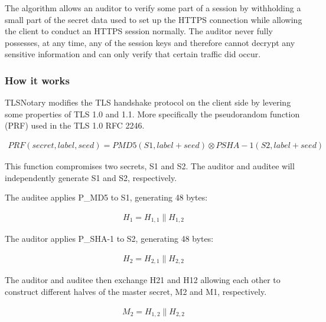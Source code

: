 The algorithm allows an auditor to verify some part of a session by withholding a small part of the secret data used to set up the HTTPS connection while allowing the client to conduct an HTTPS session normally. The auditor never fully possesses, at any time, any of the session keys and therefore cannot decrypt any sensitive information and can only verify that certain traffic did occur.

\subsubsection{How it works}
TLSNotary modifies the TLS handshake protocol on the client side by levering some properties of TLS 1.0 and 1.1. More specifically the pseudorandom function (PRF) used in the TLS 1.0 RFC 2246.

\begin{ceqn}
    \begin{align}
        PRF(secret,label,seed) = PMD5(S1,label+seed) \otimes PSHA-1(S2,label+seed)
    \end{align}
\end{ceqn}

This function compromises two secrets, S1 and S2. The auditor and auditee will independently generate S1 and S2, respectively.

The auditee applies P\_MD5 to S1, generating 48 bytes:

\begin{ceqn}
    \begin{align}
        H_{1} = H_{1,1} \parallel H_{1,2}
    \end{align}
\end{ceqn}

The auditor applies P\_SHA-1 to S2, generating 48 bytes:

\begin{ceqn}
    \begin{align}
        H_{2} = H_{2,1} \parallel H_{2,2}
    \end{align}
\end{ceqn}


The auditor and auditee then exchange H21 and H12 allowing each other to construct different halves of the master secret, M2 and M1, respectively.

\begin{ceqn}
    \begin{align}
        M_{2} = H_{1,2} \parallel H_{2,2}
    \end{align}
\end{ceqn}

